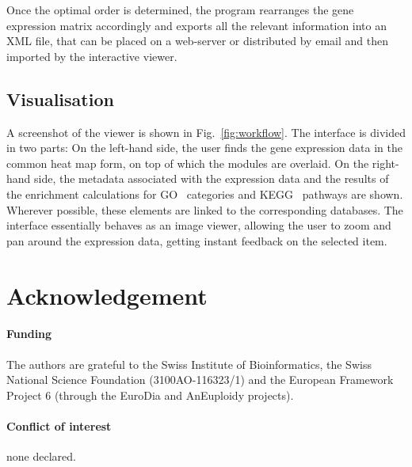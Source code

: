 \documentclass[round]{bioinfo}
\begin{document}
Once the optimal order is determined, the program rearranges the gene
expression matrix accordingly and exports all the relevant information
into an XML file, that can be placed on a web-server or distributed by
email and then imported by the interactive viewer.

\subsection{Visualisation}

A screenshot of the viewer is shown in Fig.~\ref{fig:workflow}. The
interface is divided in two parts: On the left-hand side, the user
finds the gene expression data in the common heat map form, on top of
which the modules are overlaid. On the right-hand side, the metadata
associated with the expression data and the results of the
enrichment calculations for GO~\citep{ashburner00} categories and
KEGG~\citep{kanehisa04} pathways are shown. Wherever possible, these elements
are linked to the corresponding databases. The interface essentially
behaves as an image viewer, allowing the user to zoom and pan around
the expression data, getting instant feedback on the selected
item.

\section*{Acknowledgement}

\paragraph{Funding\textcolon} The authors are grateful to the Swiss
Institute of Bioinformatics, the Swiss National Science Foundation
(3100AO-116323/1) and the European Framework Project 6 (through
the EuroDia and AnEuploidy projects).

\paragraph{Conflict of interest\textcolon} none declared.

\vspace*{-9pt}


\end{document}
